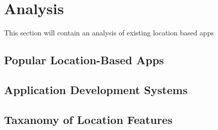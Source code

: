 \section{Analysis} %
\label{sec:analysis}
This section will contain an analysis of existing location based apps

\subsection{Popular Location-Based Apps} %
\label{sub:popular_location_based_apps}


\subsection{Application Development Systems} %
\label{sub:application_development_systems}


\subsection{Taxanomy of Location Features} %
\label{sub:taxanomy_of_location_features}

